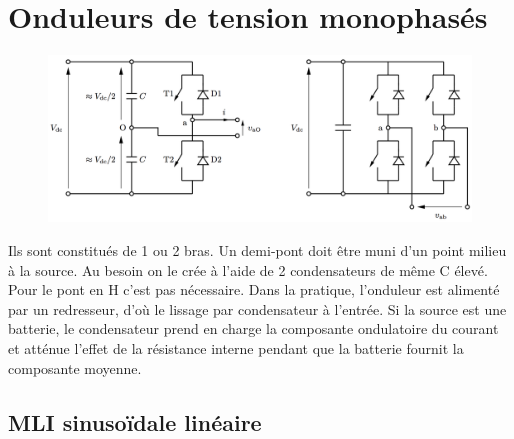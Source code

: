 \section{Onduleurs de tension monophasés}
	\begin{figure}
	\vspace{-5mm}
	\includegraphics[scale=0.28]{ch4/16}
	\end{figure}
	Ils sont constitués de 1 ou 2 bras. Un demi-pont doit être muni d'un point milieu à la source. Au besoin on le crée à l'aide de 2 condensateurs de même C élevé.  Pour le pont en H c'est pas nécessaire. Dans la pratique, l'onduleur est alimenté par un redresseur, d'où le lissage par condensateur à l'entrée. Si la source est une batterie, le condensateur prend en charge la composante ondulatoire du courant et atténue l'effet de la résistance interne pendant que la batterie fournit la composante moyenne. 
	
	\subsection{MLI sinusoïdale linéaire}
